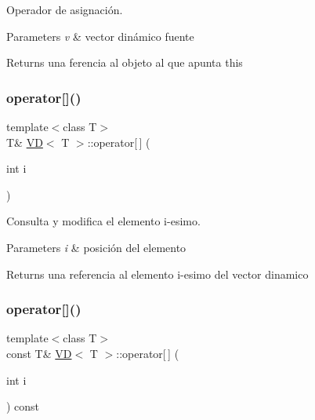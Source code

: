 Operador de asignación. 


\begin{DoxyParams}{Parameters}
{\em v} & vector dinámico fuente \\
\hline
\end{DoxyParams}
\begin{DoxyReturn}{Returns}
una ferencia al objeto al que apunta this 
\end{DoxyReturn}
\mbox{\label{class_v_d_a7d80240b5791d62b7e27657763afe712}} 
\subsubsection{\texorpdfstring{operator[]()}{operator[]()}\hspace{0.1cm}{\footnotesize\ttfamily [1/2]}}
{\footnotesize\ttfamily template$<$class T$>$ \\
T\& \mbox{\hyperlink{class_v_d}{VD}}$<$ T $>$\+::operator\mbox{[}$\,$\mbox{]} (\begin{DoxyParamCaption}\item[{int}]{i }\end{DoxyParamCaption})\hspace{0.3cm}{\ttfamily [inline]}}



Consulta y modifica el elemento i-\/esimo. 


\begin{DoxyParams}{Parameters}
{\em i} & posición del elemento \\
\hline
\end{DoxyParams}
\begin{DoxyReturn}{Returns}
una referencia al elemento i-\/esimo del vector dinamico 
\end{DoxyReturn}
\mbox{\label{class_v_d_a16ae24a4b545a02baf6733ba5c066346}} 
\subsubsection{\texorpdfstring{operator[]()}{operator[]()}\hspace{0.1cm}{\footnotesize\ttfamily [2/2]}}
{\footnotesize\ttfamily template$<$class T$>$ \\
const T\& \mbox{\hyperlink{class_v_d}{VD}}$<$ T $>$\+::operator\mbox{[}$\,$\mbox{]} (\begin{DoxyParamCaption}\item[{int}]{i }\end{DoxyParamCaption}) const\hspace{0.3cm}{\ttfamily [inline]}}

